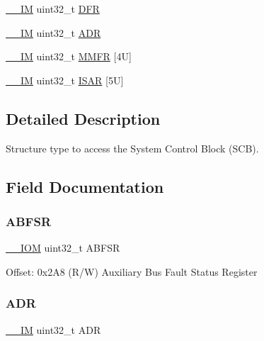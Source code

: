 \begin{DoxyCompactItemize}
\item 
\mbox{\hyperlink{core__cm4_8h_a4cc1649793116d7c2d8afce7a4ffce43}{\+\_\+\+\_\+\+IM}} uint32\+\_\+t \mbox{\hyperlink{struct_s_c_b___type_ae2b3d4530d1b0c05593b634dc46348bd}{D\+FR}}
\item 
\mbox{\hyperlink{core__cm4_8h_a4cc1649793116d7c2d8afce7a4ffce43}{\+\_\+\+\_\+\+IM}} uint32\+\_\+t \mbox{\hyperlink{struct_s_c_b___type_a72572af6d5dece4947453aeabd52575f}{A\+DR}}
\item 
\mbox{\hyperlink{core__cm4_8h_a4cc1649793116d7c2d8afce7a4ffce43}{\+\_\+\+\_\+\+IM}} uint32\+\_\+t \mbox{\hyperlink{struct_s_c_b___type_ab6c914b579d22d7eb86d0e3d9a5fde71}{M\+M\+FR}} \mbox{[}4\+U\mbox{]}
\item 
\mbox{\hyperlink{core__cm4_8h_a4cc1649793116d7c2d8afce7a4ffce43}{\+\_\+\+\_\+\+IM}} uint32\+\_\+t \mbox{\hyperlink{struct_s_c_b___type_af2950df748750d535d5d65ac1c209563}{I\+S\+AR}} \mbox{[}5\+U\mbox{]}
\end{DoxyCompactItemize}


\subsection{Detailed Description}
Structure type to access the System Control Block (S\+CB). 

\subsection{Field Documentation}
\mbox{\label{struct_s_c_b___type_aa104b9e01b129abe3de43c439916f655}} 
\subsubsection{\texorpdfstring{A\+B\+F\+SR}{ABFSR}}
{\footnotesize\ttfamily \mbox{\hyperlink{core__cm4_8h_ab6caba5853a60a17e8e04499b52bf691}{\+\_\+\+\_\+\+I\+OM}} uint32\+\_\+t A\+B\+F\+SR}

Offset\+: 0x2\+A8 (R/W) Auxiliary Bus Fault Status Register \mbox{\label{struct_s_c_b___type_a72572af6d5dece4947453aeabd52575f}} 
\subsubsection{\texorpdfstring{A\+DR}{ADR}}
{\footnotesize\ttfamily \mbox{\hyperlink{core__cm4_8h_a4cc1649793116d7c2d8afce7a4ffce43}{\+\_\+\+\_\+\+IM}} uint32\+\_\+t A\+DR}

